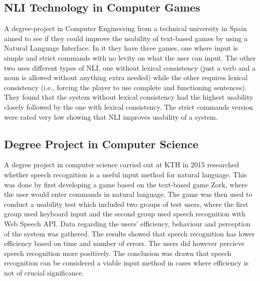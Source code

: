 \subsection{NLI Technology in Computer Games}
A degree-project in Computer Engineering from a technical university in Spain aimed to see if they could improve the usability of text-based games by using a Natural Language Interface. In it they have three games, one where input is simple and strict commands with no levity on what the user can input. The other two uses different types of NLI, one without lexical consistency (just a verb and a noun is allowed without anything extra needed) while the other requires lexical consistency (i.e., forcing the player to use complete and functioning sentences). They found that the system without lexical consistency had the highest usability closely followed by the one with lexical consistency. The strict commands version were rated very low showing that NLI improves usability of a system. \citep{Memo}

\subsection{Degree Project in Computer Science} %
A degree project in computer science carried out at KTH in 2015 researched whether speech recognition is a useful input method for natural language. This was done by first developing a game based on the text-based game Zork, where the user would enter commands in natural language. The game was then used to conduct a usability test which included two groups of test users, where the first group used keyboard input and the second group used speech recognition with Web Speech API. Data regarding the users' efficiency, behaviour and perception of the system was gathered. The results showed that speech recognition has lower efficiency based on time and number of errors. The users did however percieve speech recognition more positively. The conclusion was drawn that speech recognition can be considered a viable input method in cases where efficiency is not of crucial significance. \citep{qvar}